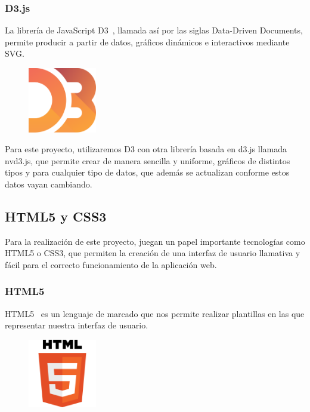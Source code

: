 \documentclass[a4paper, spanish, 12pt]{book}
\begin{document}
\subsubsection*{D3.js}
\label{subsec:d3}

La librer\'ia de JavaScript D3~\cite{d3}, llamada as\'i por las siglas Data-Driven Documents,
permite producir a partir de datos, gr\'aficos din\'amicos e interactivos mediante SVG.

\begin{figure}[H]
  \centering
  \includegraphics[width=3cm, keepaspectratio]{img/d3-logo}
\end{figure}

Para este proyecto, utilizaremos D3 con otra librer\'ia basada en d3.js llamada nvd3.js, que permite
crear de manera sencilla y uniforme, gr\'aficos de distintos tipos y para cualquier
tipo de datos, que adem\'as se actualizan conforme estos datos vayan cambiando.

\subsection{HTML5 y CSS3}
\label{subsec:html5css3}

Para la realizaci\'on de este proyecto, juegan un papel importante tecnolog\'ias
como HTML5 o CSS3, que permiten la creaci\'on de una interfaz de usuario llamativa
y f\'acil para el correcto funcionamiento de la aplicaci\'on web.

\subsubsection*{HTML5}
\label{subsec:html5}

HTML5~\cite{html5} es un lenguaje de marcado que nos permite realizar plantillas en las que
representar nuestra interfaz de usuario.

\begin{figure}[H]
  \centering
  \includegraphics[width=3cm, keepaspectratio]{img/html5-logo}
\end{figure}
\end{document}
